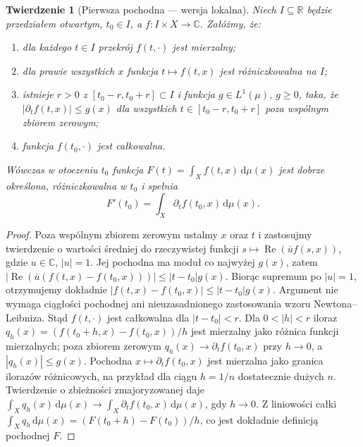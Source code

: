 \documentclass[11pt,a4paper,oneside]{book}
\numberwithin{equation}{chapter}
\theoremstyle{plain}
\newtheorem{twierdzenie}{Twierdzenie}[chapter]
\theoremstyle{definition}
\theoremstyle{remark}
\begin{document}
\begin{twierdzenie}[Pierwsza pochodna — wersja lokalna]
\label{thm:local-differentiation-11}
Niech $I\subseteq\mathbb R$ będzie przedziałem otwartym,
$t_0\in I$, a $f:I\times X\to\mathbb C$. Załóżmy, że:
\begin{enumerate}[label=\textup{(\roman*)}]
\item dla każdego $t\in I$ przekrój $f(t,\cdot)$ jest mierzalny;
\item dla prawie wszystkich $x$ funkcja $t\mapsto f(t,x)$ jest
      różniczkowalna na $I$;
\item istnieje $r>0$ z $[t_0-r,t_0+r]\subset I$ i funkcja
      $g\in L^1(\mu)$, $g\ge0$, taka, że
      $|\partial_t f(t,x)|\le g(x)$ dla wszystkich
      $t\in[t_0-r,t_0+r]$ poza wspólnym zbiorem zerowym;
\item funkcja $f(t_0,\cdot)$ jest całkowalna.
\end{enumerate}
Wówczas w otoczeniu $t_0$ funkcja
$F(t)=\int_Xf(t,x)\,\mathrm d\mu(x)$ jest dobrze określona,
różniczkowalna w $t_0$ i spełnia
\begin{equation}\label{eq:diff-param-11}
F'(t_0)=\int_X\partial_t f(t_0,x)\,\mathrm d\mu(x).
\end{equation}
\end{twierdzenie}
\begin{proof}
Poza wspólnym zbiorem zerowym ustalmy $x$ oraz $t$
i zastosujmy twierdzenie o wartości średniej do
rzeczywistej funkcji
$s\mapsto\operatorname{Re}(\overline{u}f(s,x))$,
gdzie $u\in\mathbb C$, $|u|=1$. Jej pochodna
ma moduł co najwyżej $g(x)$, zatem
$|\operatorname{Re}(\overline{u}(f(t,x)-f(t_0,x)))|
\le |t-t_0|g(x)$. Biorąc supremum po
$|u|=1$, otrzymujemy dokładnie
$|f(t,x)-f(t_0,x)|\le |t-t_0|g(x)$.
Argument nie wymaga ciągłości pochodnej ani
nieuzasadnionego zastosowania wzoru Newtona--Leibniza.
Stąd $f(t,\cdot)$ jest całkowalna dla $|t-t_0|<r$.
Dla $0<|h|<r$ iloraz
$q_h(x)=(f(t_0+h,x)-f(t_0,x))/h$ jest mierzalny
jako różnica funkcji mierzalnych; poza zbiorem zerowym
$q_h(x)\to\partial_tf(t_0,x)$ przy $h\to0$,
a $|q_h(x)|\le g(x)$. Pochodna $x\mapsto\partial_tf(t_0,x)$
jest mierzalna jako granica ilorazów różnicowych, na przykład
dla ciągu $h=1/n$ dostatecznie dużych $n$.
Twierdzenie o zbieżności zmajoryzowanej daje
$\int_Xq_h(x)\,\mathrm d\mu(x)\to
\int_X\partial_tf(t_0,x)\,\mathrm d\mu(x)$,
gdy $h\to0$. Z liniowości całki
$\int_Xq_h\,\mathrm d\mu(x)=(F(t_0+h)-F(t_0))/h$,
co jest dokładnie definicją pochodnej $F$.
\end{proof}
\end{document}
